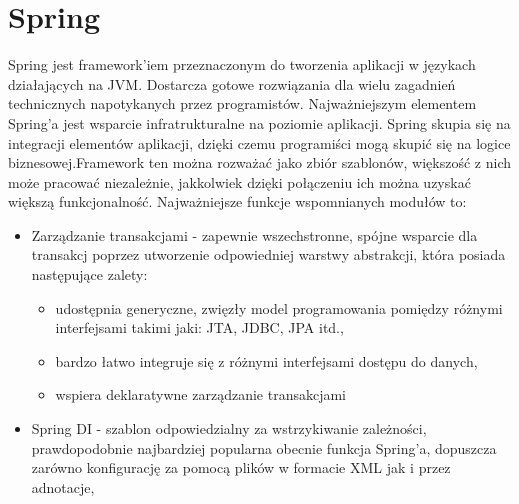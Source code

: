 \section{Spring}
Spring jest framework'iem przeznaczonym do tworzenia aplikacji w językach działających na JVM. Dostarcza gotowe rozwiązania dla wielu zagadnień technicznych napotykanych przez programistów. Najważniejszym elementem Spring'a jest wsparcie infratrukturalne na poziomie aplikacji. Spring skupia się na integracji elementów aplikacji, dzięki czemu programiści mogą skupić się na logice biznesowej.Framework ten można rozważać jako zbiór szablonów, większość z nich może pracować niezależnie, jakkolwiek dzięki połączeniu ich można uzyskać większą funkcjonalność. 
\newpage
Najważniejsze funkcje wspomnianych modułów to:
  \begin{itemize}
	\item Zarządzanie transakcjami - zapewnie wszechstronne, spójne wsparcie dla transakcj poprzez utworzenie odpowiedniej warstwy abstrakcji, która posiada następujące zalety:
	\begin{itemize}
		\item udostępnia generyczne, zwięzły model programowania pomiędzy różnymi interfejsami takimi jaki: JTA, JDBC, JPA itd.,
		\item bardzo łatwo integruje się z różnymi interfejsami dostępu do danych,
		\item wspiera deklaratywne zarządzanie transakcjami
	\end{itemize}
	\item Spring DI - szablon odpowiedzialny za wstrzykiwanie zależności, prawdopodobnie najbardziej popularna obecnie funkcja Spring'a, dopuszcza zarówno konfigurację za pomocą plików w formacie XML jak i przez adnotacje,
	

\end{itemize}
